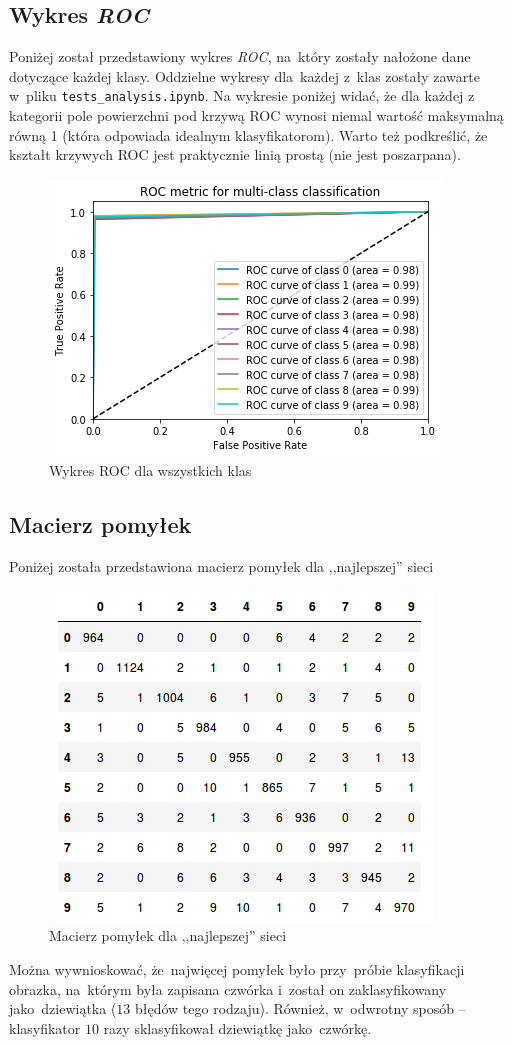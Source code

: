 \documentclass[11pt, a4paper]{article}
\begin{document}
 \subsection{Wykres \textit{ROC}}
 Poniżej został przedstawiony wykres \textit{ROC}, na~który zostały nałożone dane dotyczące każdej klasy.
 Oddzielne wykresy dla~każdej z~klas zostały zawarte w~pliku \texttt{tests\_analysis.ipynb}.
 Na wykresie poniżej widać, że dla każdej z kategorii pole powierzchni pod krzywą ROC wynosi niemal wartość maksymalną równą 1 (która odpowiada idealnym klasyfikatorom). Warto też podkreślić, że kształt krzywych ROC jest praktycznie linią prostą (nie jest poszarpana). 
 \begin{figure}[H]
		\centering
		\includegraphics[scale=0.5]{roc_auc.png}
		\caption{Wykres ROC dla wszystkich klas}
\end{figure}
	
\subsection{Macierz pomyłek}
Poniżej została przedstawiona macierz pomyłek dla ,,najlepszej'' sieci
\begin{figure}[H]
		\centering
		\includegraphics[scale=0.5]{conf_matrix.png}
		\caption{Macierz pomyłek dla ,,najlepszej'' sieci}
\end{figure}
Można wywnioskować, że~najwięcej pomyłek było przy~próbie klasyfikacji obrazka, na~którym była zapisana czwórka i~został on zaklasyfikowany jako~dziewiątka ($13$ błędów tego rodzaju). Również, w~odwrotny sposób -- klasyfikator $10$ razy sklasyfikował dziewiątkę jako~czwórkę.
\end{document}
